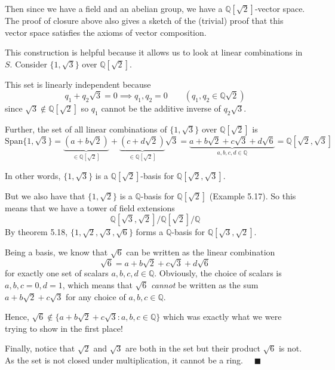 \documentclass[12pt]{article}
\newcommand{\Q}{\mathbb{Q}}
\newcommand{\qed}{\quad \blacksquare}
\begin{document}
            Then since we have a field and an abelian group, we have a $\Q[\sqrt 2]$-vector space. The proof of closure above also gives a sketch of the (trivial) proof that this vector space satisfies the axioms of vector composition. 

            This construction is helpful because it allows us to look at linear combinations in $S$. Consider $\{1, \sqrt 3\}$ over $\Q[\sqrt 2]$. 
            
            This set is linearly independent because 
                \[q_1 + q_2\sqrt 3 = 0 \implies q_1, q_2 = 0 \qquad (q_1, q_2 \in \Q{\sqrt 2})\]
            since $\sqrt 3 \not \in \Q[\sqrt 2]$ so $q_1$ cannot be the additive inverse of $q_2\sqrt 3$. 

            Further, the set of all linear combinations of $\{1, \sqrt 3\}$ over $\Q[\sqrt 2]$ is 
                \[\text{Span}\{1, \sqrt 3\} = \underbrace{(a + b\sqrt 2)}_{\in \Q[\sqrt 2]} + \underbrace{(c + d\sqrt 2)}_{\in \Q[\sqrt 2]}\sqrt 3 = \underbrace{a + b\sqrt 2 + c\sqrt 3 + d\sqrt 6}_{a,b,c,d \in \Q} = \Q[\sqrt 2, \sqrt 3]\]
         
            In other words, $\{1, \sqrt 3\}$ is a $\Q[\sqrt 2]$-basis for $\Q[\sqrt 2, \sqrt 3]$. 

            But we also have that $\{1, \sqrt 2\}$ is a $\Q$-basis for $\Q[\sqrt 2]$ (Example 5.17). So this means that we have a tower of field extensions \[\Q[\sqrt 3, \sqrt 2]/\Q[\sqrt 2]/\Q\] 
            By theorem 5.18, $\{1, \sqrt 2, \sqrt 3, \sqrt 6\}$ forms a $\Q$-basis for $\Q[\sqrt 3, \sqrt 2]$. 
          
            Being a basis, we know that $\sqrt 6$ can be written as the linear combination 
            \[\sqrt 6 = a + b\sqrt 2 + c\sqrt 3 + d\sqrt 6\]
            for exactly one set of scalars $a, b, c, d \in \Q$. Obviously, the choice of scalars is $a, b, c = 0, d = 1$, which means that $\sqrt 6$ \emph{cannot} be written as the sum $a + b\sqrt 2 + c\sqrt 3$ for any choice of $a, b, c \in \Q$. 

            Hence, $\sqrt 6 \not \in \{a + b\sqrt 2 + c\sqrt 3 : a, b, c \in \Q\}$ which was exactly what we were trying to show in the first place! 

            Finally, notice that $\sqrt 2$ and $\sqrt 3$ are both in the set but their product $\sqrt 6$ is not. As the set is not closed under multiplication, it cannot be a ring. $\qed$
        
        \color{black}
\pagebreak
\end{document}
